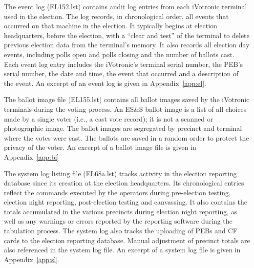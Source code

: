 The event log (EL152.lst) contains audit log entries from each iVotronic terminal used in the election.  The log  records, in  chronological order, all events that occurred on that machine in the election. It typically begins at election headquarters, before the election, with a \textquotedblleft clear and test\textquotedblright \hspace{1 mm} of the terminal to delete previous election data from the terminal's memory. It also records all election day events, including polls open and polls closing and the number of ballots cast.  Each event log entry includes the iVotronic's terminal serial number, the PEB's serial number, the date and time, the event that occurred and a description of the event. An excerpt of  an event log is given in  Appendix~\ref{app:el}. 
 
The ballot image file (EL155.lst) contains all ballot images saved by the iVotronic terminals during the voting process. An ES\&S ballot image is a list of all choices made by a single voter (i.e., a cast vote record); it is not a scanned or photographic image. The ballot images are segregated by precinct and terminal where the votes were cast. The ballots are saved in a random order to protect the privacy of the voter.  An excerpt of a ballot image file is given in  Appendix~\ref{app:bi}
 
The system log listing file (EL68a.lst) tracks activity in the election reporting database since its creation at the election headquarters. Its chronological entries reflect the commands executed by the operators during  pre-election testing, election night reporting, post-election testing and canvassing. It also contains the totals accumulated in the various precincts during election night reporting, as well as any warnings or errors reported by the reporting software during the tabulation process. The system log also tracks the uploading of PEBs and CF cards to the election reporting database. Manual adjustment of precinct totals are also referenced in the system log file. An excerpt of a system log file is given in Appendix~\ref{app:sl}.
